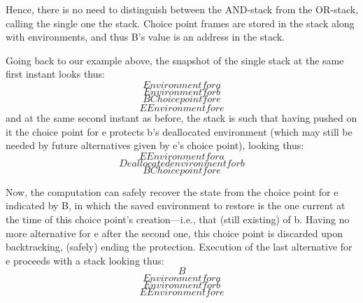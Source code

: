 Hence, there is no need to distinguish between the AND-stack from the OR-stack,
calling the single one the stack. Choice point frames are stored in the stack along
with environments, and thus B’s value is an address in the stack.

Going back to our example above, the snapshot of the single stack at the same first
instant looks thus:
\[Environment for a\]
\[Environment for b\]
\[B  Choice point for e\]
\[E  Environment for e\]
and at the same second instant as before, the stack is such that having pushed on
it the choice point for e protects b’s deallocated environment (which may still be
needed by future alternatives given by e’s choice point), looking thus:
\[E  Environment for a\]
\[Deallocated environment for b\]
\[B  Choice point for e\]

Now, the computation can safely recover the state from the choice point for e
indicated by B, in which the saved environment to restore is the one current at
the time of this choice point’s creation—i.e., that (still existing) of b. Having no
more alternative for e after the second one, this choice point is discarded upon
backtracking, (safely) ending the protection. Execution of the last alternative for
e proceeds with a stack looking thus:
\[B \]
\[Environment for a\]
\[Environment for b\]
\[E  Environment for e\]
